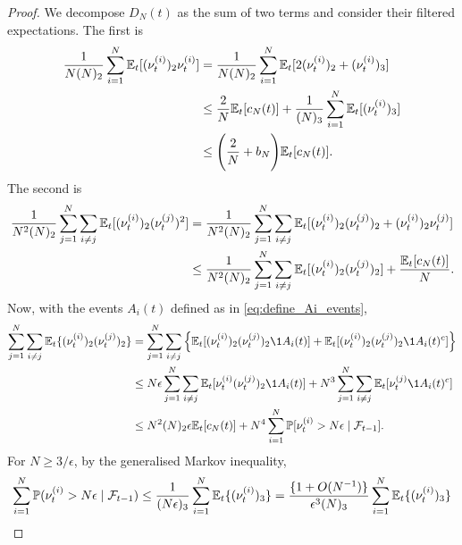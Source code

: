 \begin{proof}
We decompose $D_N(t)$ as the sum of two terms and consider their filtered expectations. The first is
\begin{align}
\frac{ 1 }{ N ( N )_2 } \sum_{ i = 1 }^N \mathbb{E}_t[ ( \nu_t^{(i)} )_2 \nu_t^{(i)} ] 
&= \frac{ 1 }{ N ( N )_2 } \sum_{ i = 1 }^N 
        \mathbb{E}_t[ 2 ( \nu_t^{(i)} )_2 + ( \nu_t^{(i)} )_3] \notag\\
&\leq \frac{ 2 }{ N } \mathbb{E}_t[ c_N( t )] + \frac{ 1 }{ ( N )_3 } \sum_{ i = 1 }^N 
        \mathbb{E}_t[ ( \nu_t^{(i)} )_3 ] \notag\\
&\leq \Bigg(\frac{ 2 }{ N } + b_N \Bigg) \mathbb{E}_t[ c_N( t ) ]. \label{DN_part_1}
\end{align}
The second is
\begin{align}
\frac{ 1 }{ N^2 ( N )_2 } \sum_{ j=1 }^N \sum_{ i \neq j } 
        \mathbb{E}_t[ ( \nu_t^{(i)} )_2 ( \nu_t^{(j)} )^2] 
&= \frac{ 1 }{ N^2 ( N )_2 } \sum_{ j=1 }^N \sum_{ i \neq j } 
        \mathbb{E}_t[ ( \nu_t^{(i)} )_2 ( \nu_t^{(j)} )_2 + ( \nu_t^{(i)} )_2 \nu_t^{(j)} ] \notag\\
&\leq \frac{ 1 }{ N^2 ( N )_2 } \sum_{ j=1 }^N \sum_{ i \neq j } 
        \mathbb{E}_t[ ( \nu_t^{(i)} )_2 ( \nu_t^{(j)} )_2 ] + \frac{ \mathbb{E}_t[ c_N( t ) ] }{ N } .         
        \label{DN_part_2}
\end{align}
Now, with the events $A_i(t)$ defined as in \eqref{eq:define_Ai_events},
\begin{align}
\sum_{ j=1 }^N \sum_{ i \neq j } \Et\{ ( \nu_t^{(i)} )_2 ( \nu_t^{(j)} )_2\} 
&= \sum_{ j=1 }^N \sum_{ i \neq j } 
        \Big\{ \Et[ ( \nu_t^{(i)} )_2 ( \nu_t^{(j)} )_2 \1{ A_i(t) } ]
        + \Et[ ( \nu_t^{(i)} )_2 ( \nu_t^{(j)} )_2 \1{ A_i(t)^c } ] \Big\} \notag\\
&\leq N \epsilon \sum_{ j=1 }^N \sum_{ i \neq j } 
        \Et[ \nu_t^{(i)} ( \nu_t^{(j)} )_2 \1{ A_i(t) } ] 
        + N^3 \sum_{ j=1 }^N \sum_{ i \neq j } \Et[ \nu_t^{(j)} \1{ A_i(t)^c } ] \notag\\
&\leq N^2 ( N )_2 \epsilon \Et[ c_N( t )] + N^4 \sum_{ i = 1 }^N 
        \Prob[ \nu_t^{(i)} > N \epsilon \mid \mathcal{F}_{t-1} ] . \label{DN_part_3}
\end{align}
For $N \geq 3 / \epsilon$, by the generalised Markov inequality,
\begin{align}\label{markovs_ineq}
\sum_{ i = 1 }^N \Prob( \nu_t^{(i)} > N \epsilon \mid \mathcal{F}_{t-1} ) &\leq \frac{ 1 }{ ( N \epsilon )_3 } \sum_{ i = 1 }^N \Et\{ ( \nu_t^{(i)} )_3\} = \frac{ \{ 1 + O( N^{ -1 } ) \} }{ \epsilon^3 ( N )_3 } \sum_{ i = 1 }^N \Et\{ ( \nu_t^{(i)} )_3\} \notag \\

\end{align}
\end{proof}
